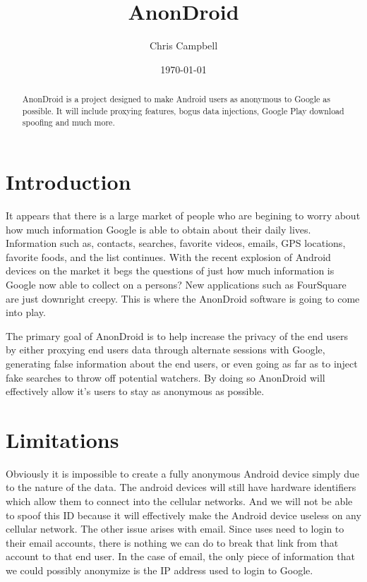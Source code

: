 \documentclass[a4paper]{article}
\begin{document}
\title{AnonDroid}
\author{Chris Campbell}
\date{\today{}}

\maketitle

\vspace{6cm}
\begin{abstract}
AnonDroid is a project designed to make Android users as anonymous to Google as
possible. It will include proxying features, bogus data injections, Google Play
download spoofing and much more.
\end{abstract}

\cleardoublepage
\tableofcontents

\cleardoublepage


\section{Introduction}

  It appears that there is a large market of people who are begining to worry
about how much information Google is able to obtain about their daily lives.
Information such as, contacts, searches, favorite videos, emails, GPS
locations, favorite foods, and the list continues. With the recent explosion of
Android devices on the market it begs the questions of just how much
information is Google now able to collect on a persons? New applications such
as FourSquare are just downright creepy. This is where the AnonDroid software
is going to come into play.

  The primary goal of AnonDroid is to help increase the privacy of the end
users by either proxying end users data through alternate sessions with Google,
generating false information about the end users, or even going as far as to
inject fake searches to throw off potential watchers. By doing so AnonDroid will
effectively allow it's users to stay as anonymous as possible.


\section{Limitations}
  
  Obviously it is impossible to create a fully anonymous Android device
simply due to the nature of the data. The android devices will still have
hardware identifiers which allow them to connect into the cellular networks.
And we will not be able to spoof this ID because it will effectively make the
Android device useless on any cellular network. The other issue arises with 
email. Since uses need to login to their email accounts, there is nothing we can
do to break that link from that account to that end user. In the case of email,
the only piece of information that we could possibly anonymize is the IP
address used to login to Google.
\end{document}
